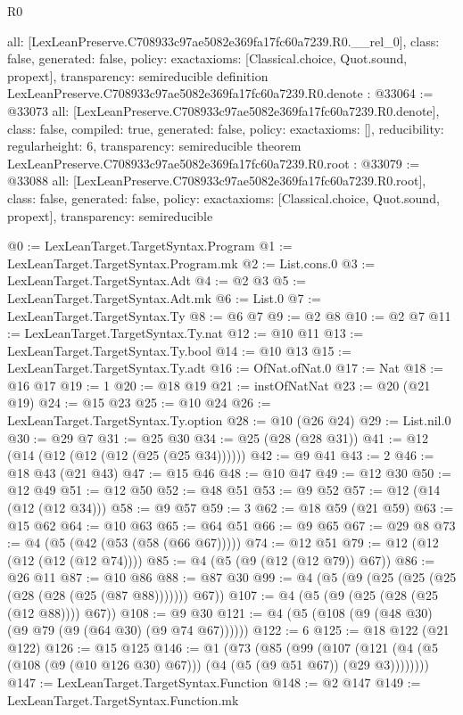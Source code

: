 \begin{lexlean}{R0}
\begin{coremodule}
{  all: [LexLeanPreserve.C708933c97ae5082e369fa17fc60a7239.R0.__rel_0],
  class: false,
  generated: false,
  policy: exact{axioms: [Classical.choice, Quot.sound, propext]},
  transparency: semireducible
}
definition LexLeanPreserve.C708933c97ae5082e369fa17fc60a7239.R0.denote : @33064 := @33073 {
  all: [LexLeanPreserve.C708933c97ae5082e369fa17fc60a7239.R0.denote],
  class: false,
  compiled: true,
  generated: false,
  policy: exact{axioms: []},
  reducibility: regular{height: 6},
  transparency: semireducible
}
theorem LexLeanPreserve.C708933c97ae5082e369fa17fc60a7239.R0.root : @33079 := @33088 {
  all: [LexLeanPreserve.C708933c97ae5082e369fa17fc60a7239.R0.root],
  class: false,
  generated: false,
  policy: exact{axioms: [Classical.choice, Quot.sound, propext]},
  transparency: semireducible
}

@0 := LexLeanTarget.TargetSyntax.Program
@1 := LexLeanTarget.TargetSyntax.Program.mk
@2 := List.cons.{0}
@3 := LexLeanTarget.TargetSyntax.Adt
@4 := @2 @3
@5 := LexLeanTarget.TargetSyntax.Adt.mk
@6 := List.{0}
@7 := LexLeanTarget.TargetSyntax.Ty
@8 := @6 @7
@9 := @2 @8
@10 := @2 @7
@11 := LexLeanTarget.TargetSyntax.Ty.nat
@12 := @10 @11
@13 := LexLeanTarget.TargetSyntax.Ty.bool
@14 := @10 @13
@15 := LexLeanTarget.TargetSyntax.Ty.adt
@16 := OfNat.ofNat.{0}
@17 := Nat
@18 := @16 @17
@19 := 1
@20 := @18 @19
@21 := instOfNatNat
@23 := @20 (@21 @19)
@24 := @15 @23
@25 := @10 @24
@26 := LexLeanTarget.TargetSyntax.Ty.option
@28 := @10 (@26 @24)
@29 := List.nil.{0}
@30 := @29 @7
@31 := @25 @30
@34 := @25 (@28 (@28 @31))
@41 := @12 (@14 (@12 (@12 (@12 (@25 (@25 @34))))))
@42 := @9 @41
@43 := 2
@46 := @18 @43 (@21 @43)
@47 := @15 @46
@48 := @10 @47
@49 := @12 @30
@50 := @12 @49
@51 := @12 @50
@52 := @48 @51
@53 := @9 @52
@57 := @12 (@14 (@12 (@12 @34)))
@58 := @9 @57
@59 := 3
@62 := @18 @59 (@21 @59)
@63 := @15 @62
@64 := @10 @63
@65 := @64 @51
@66 := @9 @65
@67 := @29 @8
@73 := @4 (@5 (@42 (@53 (@58 (@66 @67)))))
@74 := @12 @51
@79 := @12 (@12 (@12 (@12 (@12 @74))))
@85 := @4 (@5 (@9 (@12 (@12 @79)) @67))
@86 := @26 @11
@87 := @10 @86
@88 := @87 @30
@99 := @4 (@5 (@9 (@25 (@25 (@25 (@28 (@28 (@25 (@87 @88))))))) @67))
@107 := @4 (@5 (@9 (@25 (@28 (@25 (@12 @88)))) @67))
@108 := @9 @30
@121 := @4 (@5 (@108 (@9 (@48 @30) (@9 @79 (@9 (@64 @30) (@9 @74 @67))))))
@122 := 6
@125 := @18 @122 (@21 @122)
@126 := @15 @125
@146 := @1
    (@73
      (@85
        (@99
          (@107 (@121 (@4 (@5 (@108 (@9 (@10 @126 @30) @67))) (@4 (@5 (@9 @51 @67)) (@29 @3))))))))
@147 := LexLeanTarget.TargetSyntax.Function
@148 := @2 @147
@149 := LexLeanTarget.TargetSyntax.Function.mk

\end{coremodule}
\end{lexlean}
